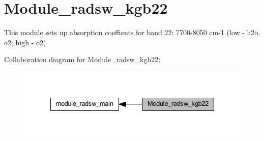 \hypertarget{group__module__radsw__kgb22}{}\section{Module\+\_\+radsw\+\_\+kgb22}
\label{group__module__radsw__kgb22}


This module sets up absorption coeffients for band 22\+: 7700-\/8050 cm-\/1 (low -\/ h2o, o2; high -\/ o2)  


Collaboration diagram for Module\+\_\+radsw\+\_\+kgb22\+:\nopagebreak
\begin{figure}[H]
\begin{center}
\leavevmode
\includegraphics[width=331pt]{group__module__radsw__kgb22}
\end{center}
\end{figure}
